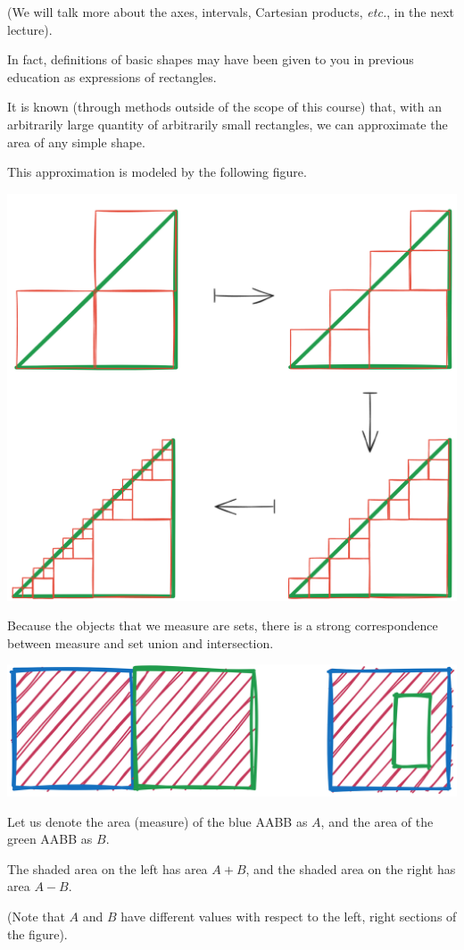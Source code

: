 \documentclass[letterpaper,twoside]{article}
\begin{document}
\begin{multicols*}{2}
(We will talk more about the axes, intervals, Cartesian products, \textit{etc.}, in the next lecture).

In fact, definitions of basic shapes may have been given to you in previous education as expressions of rectangles.

It is known (through methods outside of the scope of this course) that, with an arbitrarily large quantity of arbitrarily small rectangles, we can approximate the area of any simple shape.

This approximation is modeled by the following figure.

\includegraphics[width=\linewidth]{01.png}

Because the objects that we measure are sets, there is a strong correspondence between measure and set union and intersection.

\includegraphics[width=\linewidth]{02.png}

Let us denote the area (measure) of the blue AABB as $A$, and the area of the green AABB as $B$.

The shaded area on the left has area $A+B$, and the shaded area on the right has area $A-B$.

(Note that $A$ and $B$ have different values with respect to the left, right sections of the figure).




\hfill{}
\end{multicols*}
\end{document}
